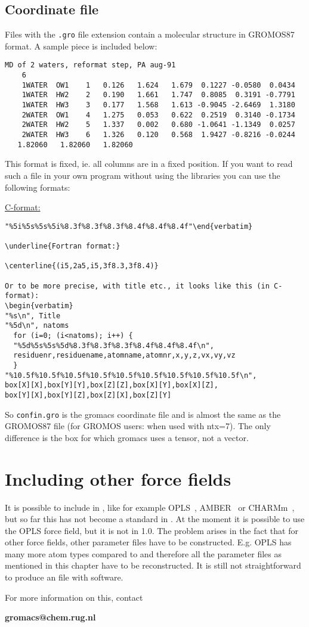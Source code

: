 \subsection{Coordinate file}
\label{subsec:grofile}
Files with the {\tt .gro} file extension contain a molecular structure in 
GROMOS87 format. A sample piece is included below:
{\small\begin{verbatim}
MD of 2 waters, reformat step, PA aug-91
    6
    1WATER  OW1    1   0.126   1.624   1.679  0.1227 -0.0580  0.0434
    1WATER  HW2    2   0.190   1.661   1.747  0.8085  0.3191 -0.7791
    1WATER  HW3    3   0.177   1.568   1.613 -0.9045 -2.6469  1.3180
    2WATER  OW1    4   1.275   0.053   0.622  0.2519  0.3140 -0.1734
    2WATER  HW2    5   1.337   0.002   0.680 -1.0641 -1.1349  0.0257
    2WATER  HW3    6   1.326   0.120   0.568  1.9427 -0.8216 -0.0244
   1.82060   1.82060   1.82060
\end{verbatim}}
This format is fixed, ie. all columns are in a fixed position. If you
want to read such a file in your own program without using the
{\gromacs} libraries you can use the following formats:

\underline{C-format:}
\begin{verbatim}"%5i%5s%5s%5i%8.3f%8.3f%8.3f%8.4f%8.4f%8.4f"\end{verbatim}

\underline{Fortran format:} 

\centerline{(i5,2a5,i5,3f8.3,3f8.4)}

Or to be more precise, with title etc., it looks like this (in C-format):
\begin{verbatim}
"%s\n", Title
"%5d\n", natoms
  for (i=0; (i<natoms); i++) {
  "%5d%5s%5s%5d%8.3f%8.3f%8.3f%8.4f%8.4f%8.4f\n",
  residuenr,residuename,atomname,atomnr,x,y,z,vx,vy,vz
  }
"%10.5f%10.5f%10.5f%10.5f%10.5f%10.5f%10.5f%10.5f%10.5f\n",
box[X][X],box[Y][Y],box[Z][Z],box[X][Y],box[X][Z],
box[Y][X],box[Y][Z],box[Z][X],box[Z][Y]
\end{verbatim}

So \verb'confin.gro' is the gromacs coordinate file and is almost  the
same as the GROMOS87 file (for GROMOS users: when used with
ntx=7). The only difference is the box for which gromacs uses a
tensor, not a vector.

\section{Including other force fields}
\label{sec:otherff}
It is possible to include  
in {\gromacs}, like for
example OPLS~\cite{Jorgensen88}, AMBER~\cite{Weiner86} or 
CHARMm~\cite{BBrooks83},
but so far this has not become a standard in {\gromacs}. At the moment
it is possible to use the OPLS force field, but it is not in {\gromacs}
1.0. The problem arises in the fact that for other force fields, other
parameter files have to be constructed. E.g. OPLS has many more atom
types compared to {\gromacs} and therefore all the parameter files as
mentioned in this chapter have to be reconstructed. It is still not
straightforward to produce an  file with {\gromacs}
software. 

For more information on this, contact

{\bf gromacs@chem.rug.nl}

